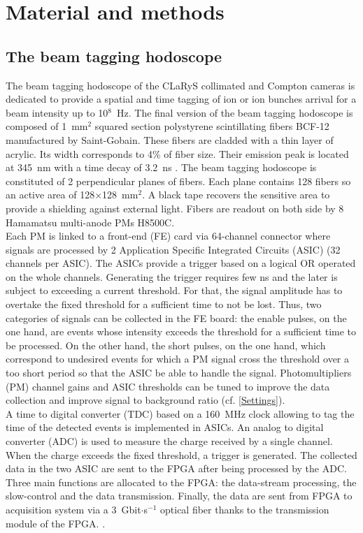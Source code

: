 \documentclass[a4paper,11pt]{article}
\begin{document}
\section{Material and methods}
\subsection{The beam tagging hodoscope}
The beam tagging hodoscope of the CLaRyS collimated and Compton cameras is dedicated to provide a spatial and time tagging of ion or ion bunches arrival for a beam intensity up to 10$^{8}$~Hz.
The final version of the beam tagging hodoscope is composed  of 1~mm$^{2}$ squared section polystyrene scintillating fibers BCF-12 manufactured by Saint-Gobain. These fibers are cladded with a thin layer of acrylic. Its width corresponds to 4\% of fiber size. Their emission peak is located at 345~nm with a time decay of 3.2~ns \cite{SaintGobain2017}.
The beam tagging hodoscope is constituted of 2 perpendicular planes of fibers. Each plane contains 128 fibers so an active area of 128$\times$128~mm$^{2}$. A black tape recovers the sensitive area to provide a shielding against external light. Fibers are readout on both side by 8 Hamamatsu multi-anode PMs H8500C. \\

Each PM is linked to a front-end (FE) card via 64-channel connector where signals are processed by 2 Application Specific Integrated Circuits (ASIC) (32 channels per ASIC). The ASICs provide a trigger based on a logical OR operated on the whole channels. Generating the trigger requires few ns and the later is subject to exceeding a current threshold. For that, the signal amplitude has to overtake the fixed threshold for a sufficient time to not be lost. Thus, two categories of signals can be collected in the FE board: the enable pulses, on the one hand, are events whose intensity exceeds the threshold for a sufficient time to be processed. On the other hand, the short pulses, on the one hand, which correspond to undesired events for which a PM signal cross the threshold over a too short period so that the ASIC be able to handle the signal.
Photomultipliers (PM) channel gains and ASIC thresholds can be tuned to improve the data collection and improve signal to background ratio (cf. \ref{Settings}). \\

A time to digital converter (TDC) based on a 160~MHz clock allowing to tag the time of the detected events is implemented in ASICs. An analog to digital converter (ADC) is used to measure the charge received by a single channel. When the charge exceeds the fixed threshold, a trigger is generated. The collected data in the two ASIC are sent to the FPGA after being processed by the ADC. Three main functions are allocated to the FPGA: the data-stream processing, the slow-control and the data transmission. Finally, the data are sent from FPGA to acquisition system via a 3~Gbit$\cdot$s$^{-1}$ optical fiber thanks to the transmission module of the FPGA. \cite{deng2013, Chen2017, Chen2019}. \\
\end{document}
